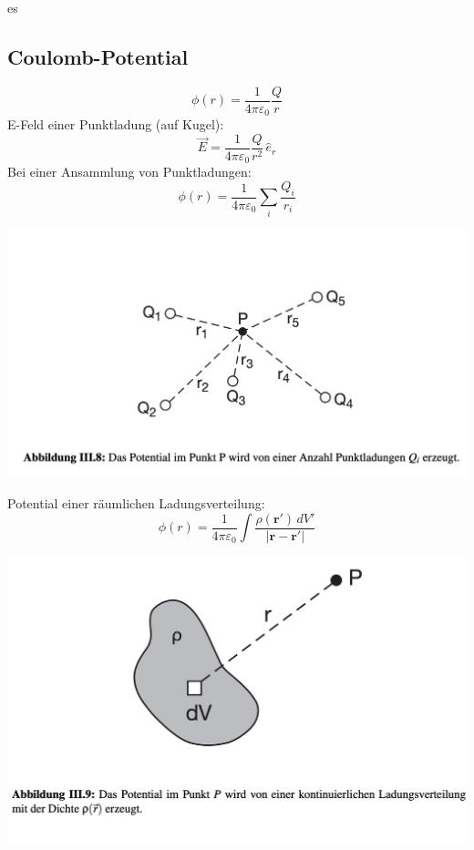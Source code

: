es\documentclass[a4paper, fontsize=8pt, landscape]{scrartcl}
\begin{document}
\begin{multicols*}{4}
\subsection{Coulomb-Potential}
    \[\phi(r) = \frac{1}{4\pi\varepsilon_0}\frac{Q}{r}\]
    E-Feld einer Punktladung (auf Kugel):
    \[\vec E = \frac{1}{4\pi\varepsilon_0} \frac{Q}{r^2} \,\hat{e}_r\]
    Bei einer Ansammlung von Punktladungen:
    \[\phi(r) = \frac{1}{4\pi\varepsilon_0}\sum_i \frac{Q_i}{r_i}\]
    \begin{center}
        \includegraphics[scale=0.2]{Images/Punktladungen.png}
    \end{center}
    Potential einer räumlichen Ladungsverteilung:
    \[\phi(r) = \frac{1}{4\pi\varepsilon_0} \int \frac{\rho(\mathbf{r}')\,dV'}{|\mathbf{r} - \mathbf{r}'|}\]
    \begin{center}
        \includegraphics[scale=0.2]{Images/Ladungsverteilung.png}
    \end{center}


\end{multicols*}
\end{document}
